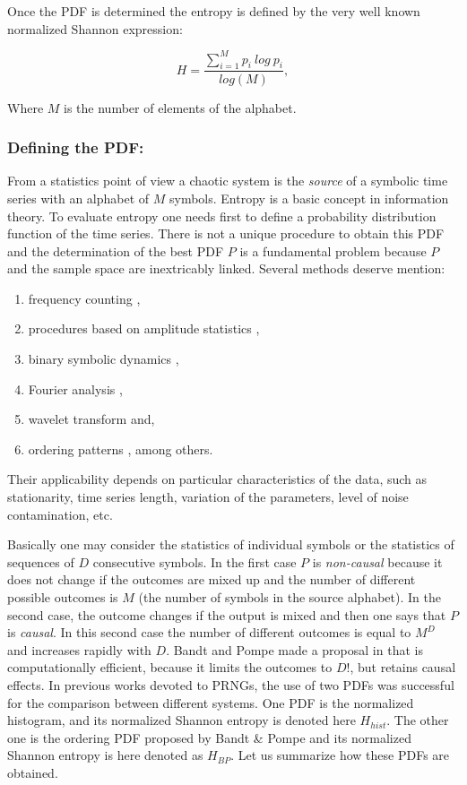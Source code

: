 Once the PDF is determined the entropy is defined by the very well known normalized Shannon expression:

\begin{equation}
H=\frac{\sum_{i=1}^{M}{p_i~log~p_i}}{log(M)}, \label{eq:shannon}
\end{equation}

Where $M$ is the number of elements of the alphabet.
\subsubsection{Defining the PDF:}

From a statistics point of view a chaotic system is the \textsl{source} of a symbolic time series with an alphabet of $M$ symbols. Entropy is a basic concept in information theory. To evaluate entropy  one needs first to define a probability distribution function of the time series. There is not a unique procedure to obtain this PDF and the determination of the best PDF $P$ is a fundamental problem because $P$ and the sample space are inextricably linked.
Several methods deserve mention: 
\begin{enumerate}
\item frequency counting \cite{Rosso2009}, 
\item procedures based on amplitude statistics \cite{DeMicco2008}, 
\item binary symbolic dynamics \cite{Mischaikow1999}, 
\item Fourier analysis \cite{Powell1979}, 
\item wavelet transform \cite{Rosso2001} and,
\item ordering patterns \cite{Pompe2002}, among others.  
\end{enumerate}
Their applicability depends on particular characteristics of the data, such as stationarity, time series length, variation of the parameters, level of noise contamination, etc.

Basically one may consider the statistics of individual symbols or the statistics of sequences of $D$ consecutive symbols. In the first case  $P$ is \emph{non-causal} because it does not change if the outcomes are mixed up and the number of different possible outcomes is $M$ (the number of symbols in the source alphabet). In the second case, the outcome changes if the output is mixed and then one says that $P$ is \emph{causal}. In this second case the number of different outcomes is equal to $M^D$ and increases rapidly with $D$. Bandt and Pompe made a proposal in \cite{Pompe2002} that is computationally efficient, because it limits the outcomes to $D!$, but retains causal effects. In previous works devoted to PRNGs, the use of two
PDFs was successful for the comparison between different systems. One PDF is the
normalized histogram, and its normalized Shannon
entropy is denoted here $H_{hist}$. The other one is the ordering PDF
proposed by Bandt \& Pompe \cite{Pompe2002} and its  normalized Shannon entropy is  here denoted as $H_{BP}$. Let us summarize how these
PDFs are obtained.

